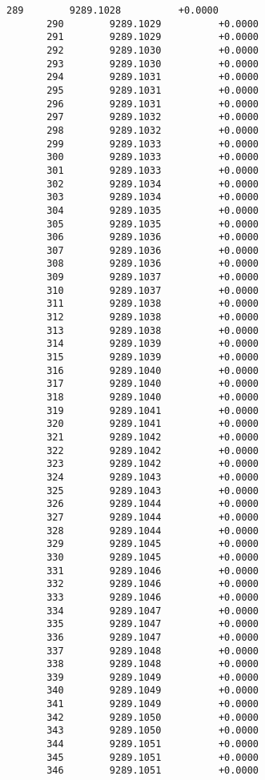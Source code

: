 \documentclass[11pt]{article}
\begin{document}
\begin{Verbatim}[commandchars=\\\{\}]
       289        9289.1028          +0.0000
       290        9289.1029          +0.0000
       291        9289.1029          +0.0000
       292        9289.1030          +0.0000
       293        9289.1030          +0.0000
       294        9289.1031          +0.0000
       295        9289.1031          +0.0000
       296        9289.1031          +0.0000
       297        9289.1032          +0.0000
       298        9289.1032          +0.0000
       299        9289.1033          +0.0000
       300        9289.1033          +0.0000
       301        9289.1033          +0.0000
       302        9289.1034          +0.0000
       303        9289.1034          +0.0000
       304        9289.1035          +0.0000
       305        9289.1035          +0.0000
       306        9289.1036          +0.0000
       307        9289.1036          +0.0000
       308        9289.1036          +0.0000
       309        9289.1037          +0.0000
       310        9289.1037          +0.0000
       311        9289.1038          +0.0000
       312        9289.1038          +0.0000
       313        9289.1038          +0.0000
       314        9289.1039          +0.0000
       315        9289.1039          +0.0000
       316        9289.1040          +0.0000
       317        9289.1040          +0.0000
       318        9289.1040          +0.0000
       319        9289.1041          +0.0000
       320        9289.1041          +0.0000
       321        9289.1042          +0.0000
       322        9289.1042          +0.0000
       323        9289.1042          +0.0000
       324        9289.1043          +0.0000
       325        9289.1043          +0.0000
       326        9289.1044          +0.0000
       327        9289.1044          +0.0000
       328        9289.1044          +0.0000
       329        9289.1045          +0.0000
       330        9289.1045          +0.0000
       331        9289.1046          +0.0000
       332        9289.1046          +0.0000
       333        9289.1046          +0.0000
       334        9289.1047          +0.0000
       335        9289.1047          +0.0000
       336        9289.1047          +0.0000
       337        9289.1048          +0.0000
       338        9289.1048          +0.0000
       339        9289.1049          +0.0000
       340        9289.1049          +0.0000
       341        9289.1049          +0.0000
       342        9289.1050          +0.0000
       343        9289.1050          +0.0000
       344        9289.1051          +0.0000
       345        9289.1051          +0.0000
       346        9289.1051          +0.0000

\end{Verbatim}
\end{document}
